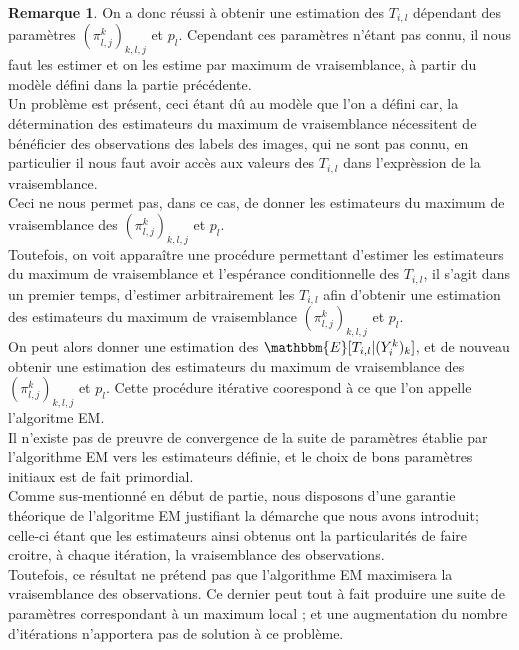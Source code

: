 \documentclass[frenchb]{report}
\newcommand{\1}{\mathbbm{1}}
\newcommand{\E}{\mathbbm{E}}
\theoremstyle{definition}\newtheorem{defn}{Définition}
\theoremstyle{definition}\newtheorem{exm}{Exemple}
\theoremstyle{definition}\newtheorem{nota}{Notation}
\theoremstyle{definition}\newtheorem{rem}{Remarque}
\begin{document}
\begin{rem}
On a donc réussi à obtenir une estimation des $T_{i,l}$ dépendant des paramètres $(\pi^k_{l,j})_{k,l,j}$ et $p_l$. Cependant ces paramètres n'étant pas connu, il nous faut les estimer et on les estime par maximum de vraisemblance, à partir du modèle défini dans la partie précédente.\\
Un problème est présent, ceci étant dû au modèle que l'on a défini car, la détermination des estimateurs du maximum de vraisemblance nécessitent de bénéficier des observations des labels des images, qui ne sont pas connu, en particulier il nous faut avoir accès aux valeurs des $T_{i,l}$ dans l'exprèssion de la vraisemblance.\\

Ceci ne nous permet pas, dans ce cas, de donner les estimateurs du maximum de vraisemblance des $(\pi^k_{l,j})_{k,l,j}$ et $p_l$. \\
Toutefois, on voit apparaître une procédure permettant d'estimer les estimateurs du maximum de vraisemblance et l'espérance conditionnelle des $T_{i,l}$, il s'agit dans un premier temps, d'estimer arbitrairement les $T_{i,l}$ afin d'obtenir une estimation des estimateurs du maximum de vraisemblance $(\pi^k_{l,j})_{k,l,j}$ et $p_l$.\\
On peut alors donner une estimation des $\E[T_{i,l}|(Y^k_i)_k]$, et de nouveau obtenir une estimation des estimateurs du maximum de vraisemblance des $(\pi^k_{l,j})_{k,l,j}$ et $p_l$. Cette procédure itérative coorespond à ce que l'on appelle l'algoritme EM.\\

Il n'existe pas de preuvre de convergence de la suite de paramètres établie par l'algorithme EM vers les estimateurs définie, et le choix de bons paramètres initiaux est de fait primordial.\\
Comme sus-mentionné en début de partie, nous disposons d'une garantie théorique de l'algoritme EM justifiant la démarche que nous avons introduit;  celle-ci étant que les estimateurs ainsi obtenus ont la particularités de faire croitre, à chaque itération, la vraisemblance des observations. \\
Toutefois, ce résultat ne prétend pas que l'algorithme EM maximisera la vraisemblance des observations. Ce dernier peut tout à fait produire une suite de paramètres correspondant à un maximum local ; et une augmentation du nombre d'itérations n'apportera pas de solution à ce problème.\\
\end{rem}
\bigskip
\bigskip
\bigskip
\end{document}
